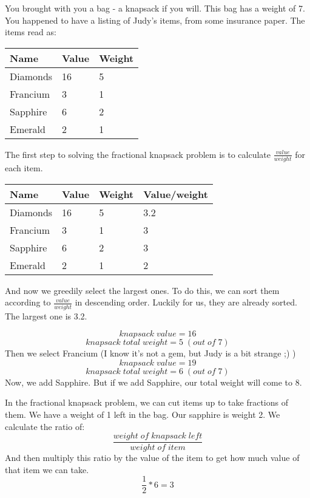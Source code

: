 \documentclass{article}
\begin{document}
You brought with you a bag - a knapsack if you will. This bag has a weight of 7. You happened to have a listing of  Judy's items, from some insurance paper. The items read as:

\begin{center}
\begin{tabular}{|l|l|l|}
\hline
\centering
\textbf{Name} & \textbf{Value} & \textbf{Weight} \\ \hline
Diamonds      & 16             & 5               \\ \hline
Francium      & 3              & 1               \\ \hline
Sapphire      & 6              & 2               \\ \hline
Emerald       & 2              & 1               \\ \hline
\end{tabular}
\end{center}
The first step to solving the fractional knapsack problem is to calculate $\frac{value}{weight}$ for each item.

\begin{center}
\begin{tabular}{|l|l|l|l|}
\hline
\centering
\textbf{Name} & \textbf{Value} & \textbf{Weight} & \textbf{Value/weight} \\ \hline
Diamonds      & 16             & 5 & 3.2              \\ \hline
Francium      & 3              & 1    & 3           \\ \hline
Sapphire      & 6              & 2       & 3        \\ \hline
Emerald       & 2              & 1       & 2        \\ \hline
\end{tabular}
\end{center}
And now we greedily select the largest ones. To do this, we can sort them according to $\frac{value}{weight}$ in descending order. Luckily for us, they are already sorted. The largest one is 3.2. 


$$knapsack \;value = 16$$
$$knapsack \;total \;weight = 5 \;(out \;of \;7)$$
Then we select Francium (I know it's not a gem, but Judy is a bit strange ;) )
$$knapsack \;value = 19$$
$$knapsack \;total \;weight = 6 \;(out \;of \;7)$$
Now, we add Sapphire. But if we add Sapphire, our total weight will come to 8. 

In the fractional knapsack problem, we can cut items up to take fractions of them. We have a weight of 1 left in the bag. Our sapphire is weight 2. We calculate the ratio of:
$$\frac{weight\;of\;knapsack\;left}{weight\;of\;item}$$
And then multiply this ratio by the value of the item to get how much value of that item we can take.
$$\frac{1}{2} * 6 = 3$$
\end{document}
